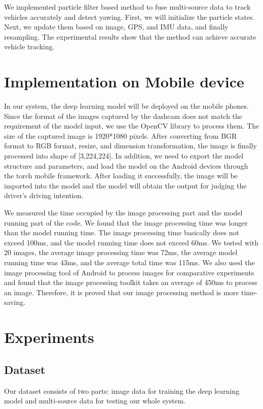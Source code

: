 \documentclass[journal]{IEEEtran}
\begin{document}
We implemented particle filter based method to fuse multi-source data to track vehicles accurately and detect yawing. First, we will initialize the particle states. Next, we update them based on image, GPS, and IMU data, and finally resampling. The experimental results show that the method can achieve accurate vehicle tracking.

\section{Implementation on Mobile device}
In our system, the deep learning model will be deployed on the mobile phones. Since the format of the images captured by the dashcam does not match the requirement of the model input, we use the OpenCV library to process them. The size of the captured image is 1920*1080 pixels. After converting from BGR format to RGB format, resize, and dimension transformation, the image is finally processed into shape of [3,224,224]. In addition, we need to export the model structure and parameters, and load the model on the Android devices through the torch mobile framework. After loading it successfully, the image will be imported into the model and the model will obtain the output for judging the driver's driving intention.

We measured the time occupied by the image processing part and the model running part of the code. We found that the image processing time was longer than the model running time. The image processing time basically does not exceed 100ms, and the model running time does not exceed 60ms. We tested with 20 images, the average image processing time was 72ms, the average model running time was 43ms, and the average total time was 115ms. We also used the image processing tool of Android to process images for comparative experiments and found that the image processing toolkit takes an average of 450ms to process an image. Therefore, it is proved that our image processing method is more time-saving.

\section{Experiments}\label{sec:exp}
\subsection{Dataset}
Our dataset consists of two parts: image data for training the deep learning model and multi-source data for testing our whole system.
\end{document}
